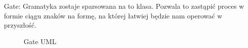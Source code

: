 Gate:
Gramatyka zostaje sparsowana na to klasa. Pozwala to zastąpić proces w formie ciągu znaków na formę, na której łatwiej będzie nam operować w przyszłość.
\begin{figure}[h]
	\caption{\label{fig:subcaption_example}Gate UML}
\end{figure}

